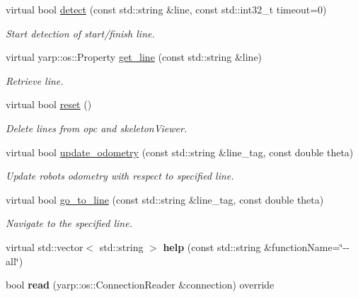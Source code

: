 \begin{DoxyCompactItemize}
\item 
virtual bool \hyperlink{classlineDetector__IDL_a393124f2e4ea02a0ef2d4ba4df5d73c0}{detect} (const std\+::string \&line, const std\+::int32\+\_\+t timeout=0)
\begin{DoxyCompactList}\small\item\em Start detection of start/finish line. \end{DoxyCompactList}\item 
virtual yarp\+::os\+::\+Property \hyperlink{classlineDetector__IDL_ae617a7505a800d086c201e047f32918b}{get\+\_\+line} (const std\+::string \&line)
\begin{DoxyCompactList}\small\item\em Retrieve line. \end{DoxyCompactList}\item 
virtual bool \hyperlink{classlineDetector__IDL_a665153eb57fa761fe6dd9ae741169f7b}{reset} ()
\begin{DoxyCompactList}\small\item\em Delete lines from opc and skeleton\+Viewer. \end{DoxyCompactList}\item 
virtual bool \hyperlink{classlineDetector__IDL_ad4a235bdfaed101e3dd2435902347df3}{update\+\_\+odometry} (const std\+::string \&line\+\_\+tag, const double theta)
\begin{DoxyCompactList}\small\item\em Update robot\textquotesingle{}s odometry with respect to specified line. \end{DoxyCompactList}\item 
virtual bool \hyperlink{classlineDetector__IDL_af8af05e2ad1ad143c42d5229242bc7f3}{go\+\_\+to\+\_\+line} (const std\+::string \&line\+\_\+tag, const double theta)
\begin{DoxyCompactList}\small\item\em Navigate to the specified line. \end{DoxyCompactList}\item 
\mbox{\label{classlineDetector__IDL_ac0e08d7eaab969b6d38519abd4118923}} 
virtual std\+::vector$<$ std\+::string $>$ {\bfseries help} (const std\+::string \&function\+Name=\char`\"{}-\/-\/all\char`\"{})
\item 
\mbox{\label{classlineDetector__IDL_a0ae07f2cb8270fc30b5358f4ba1e9796}} 
bool {\bfseries read} (yarp\+::os\+::\+Connection\+Reader \&connection) override
\end{DoxyCompactItemize}


